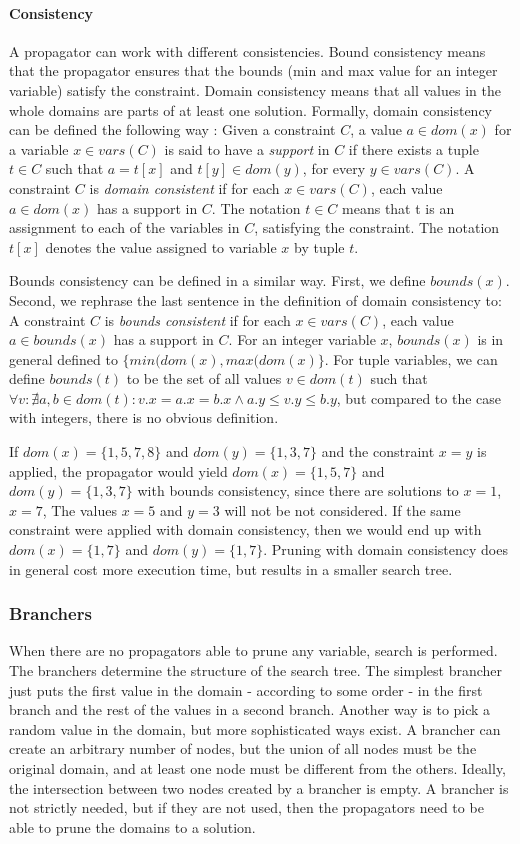 \documentclass[a4paper,11pt]{article}
\begin{document}
\paragraph{Consistency}
A propagator can work with different consistencies. Bound consistency means that the propagator ensures that the bounds (min and max value for an integer variable) satisfy the constraint. Domain consistency means that all values in the whole domains are parts of at least one solution. Formally, domain consistency can be defined the following way \cite{FruehwirthMS06}: Given a constraint $C$, a value $a\in dom(x)$ for a variable $x\in vars(C)$ is said to have a \textit{support} in $C$ if there exists a tuple $t\in C$ such that $a=t[x]$ and $t[y]\in dom(y)$, for every $y\in vars(C)$. A constraint $C$ is \textit{domain consistent} if for each $x\in vars(C)$, each value $a\in dom(x)$ has a support in $C$. The notation $t\in C$ means that t is an assignment to each of the variables in $C$, satisfying the constraint. The notation $t[x]$ denotes the value assigned to variable $x$ by tuple $t$. 

Bounds consistency can be defined in a similar way. First, we define $bounds(x)$. Second, we rephrase the last sentence in the definition of domain consistency to: A constraint $C$ is \textit{bounds consistent} if for each $x\in vars(C)$, each value $a\in bounds(x)$ has a support in $C$. For an integer variable $x$, $bounds(x)$ is in general defined to $\{min(dom(x),max(dom(x)\}$. For tuple variables, we can define $bounds(t)$ to be the set of all values $v\in dom(t)$ such that $\forall v:\nexists a,b\in dom(t):v.x=a.x=b.x \land a.y \le v.y \le b.y$, but compared to the case with integers, there is no obvious definition.

If $dom(x)=\{1,5,7,8\}$ and $dom(y)=\{1,3,7\}$ and the constraint $x=y$ is applied, the propagator would yield $dom(x)=\{1,5,7\}$ and $dom(y)=\{1,3,7\}$ with bounds consistency, since there are solutions to $x=1$, $x=7$, The values $x=5$ and $y=3$ will not be not considered. If the same constraint were applied with domain consistency, then we would end up with $dom(x)=\{1,7\}$ and $dom(y)=\{1,7\}$. Pruning with domain consistency does in general cost more execution time, but results in a smaller search tree.

\subsubsection{Branchers}
\label{sec:branchers}
When there are no propagators able to prune any variable, search is performed. The branchers determine the structure of the search tree. The simplest brancher just puts the first value in the domain - according to some order - in the first branch and the rest of the values in a second branch. Another way is to pick a random value in the domain, but more sophisticated ways exist. A brancher can create an arbitrary number of nodes, but the union of all nodes must be the original domain, and at least one node must be different from the others. Ideally, the intersection between two nodes created by a brancher is empty. A brancher is not strictly needed, but if they are not used, then the propagators need to be able to prune the domains to a solution.
\end{document}
